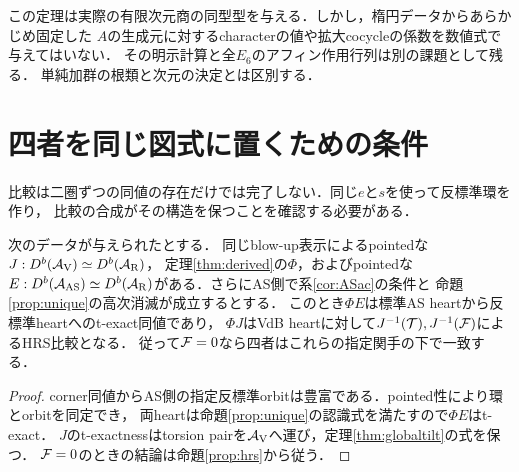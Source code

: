 \begin{remark}[同型型と生成元の係数]
この定理は実際の有限次元商の同型型を与える．しかし，楕円データからあらかじめ固定した
$A$の生成元に対するcharacterの値や拡大cocycleの係数を数値式で与えてはいない．
その明示計算と全$E_6$のアフィン作用行列は別の課題として残る．
単純加群の根類と次元の決定とは区別する．
\end{remark}






\section{四者を同じ図式に置くための条件}\label{sec:alignment}
比較は二圏ずつの同値の存在だけでは完了しない．同じ$e$と$s$を使って反標準環を作り，
比較の合成がその構造を保つことを確認する必要がある．
\begin{proposition}[pointedな比較の接続]\label{prop:alignment}
次のデータが与えられたとする．
同じblow-up表示によるpointedな$J:D^b(\mathcal A_{\mathrm V})\simeq D^b(\mathcal A_{\mathrm R})$，
定理\ref{thm:derived}の$\Phi$，およびpointedな
$E:D^b(\mathcal A_{\mathrm{AS}})\simeq D^b(\mathcal A_{\mathrm R})$がある．さらにAS側で系\ref{cor:ASac}の条件と
命題\ref{prop:unique}の高次消滅が成立するとする．
このとき$\Phi E$は標準AS heartから反標準heartへのt-exact同値であり，
$\Phi J$はVdB heartに対して$J^{-1}(\mathcal T),J^{-1}(\mathcal F)$によるHRS比較となる．
従って$\mathcal F=0$なら四者はこれらの指定関手の下で一致する．
\end{proposition}
\begin{proof}
corner同値からAS側の指定反標準orbitは豊富である．pointed性により環とorbitを同定でき，
両heartは命題\ref{prop:unique}の認識式を満たすので$\Phi E$はt-exact．
$J$のt-exactnessはtorsion pairを$\mathcal A_{\mathrm V}$へ運び，定理\ref{thm:globaltilt}の式を保つ．
$\mathcal F=0$のときの結論は命題\ref{prop:hrs}から従う．
\end{proof}

